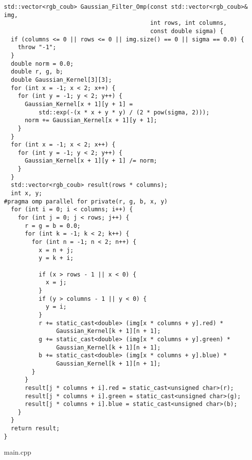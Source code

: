 \documentclass{report}
\begin{document}
\begin{lstlisting}
std::vector<rgb_coub> Gaussian_Filter_Omp(const std::vector<rgb_coub>& img,
                                          int rows, int columns,
                                          const double sigma) {
  if (columns <= 0 || rows <= 0 || img.size() == 0 || sigma == 0.0) {
    throw "-1";
  }
  double norm = 0.0;
  double r, g, b;
  double Gaussian_Kernel[3][3];
  for (int x = -1; x < 2; x++) {
    for (int y = -1; y < 2; y++) {
      Gaussian_Kernel[x + 1][y + 1] =
          std::exp(-(x * x + y * y) / (2 * pow(sigma, 2)));
      norm += Gaussian_Kernel[x + 1][y + 1];
    }
  }
  for (int x = -1; x < 2; x++) {
    for (int y = -1; y < 2; y++) {
      Gaussian_Kernel[x + 1][y + 1] /= norm;
    }
  }
  std::vector<rgb_coub> result(rows * columns);
  int x, y;
#pragma omp parallel for private(r, g, b, x, y)
  for (int i = 0; i < columns; i++) {
    for (int j = 0; j < rows; j++) {
      r = g = b = 0.0;
      for (int k = -1; k < 2; k++) {
        for (int n = -1; n < 2; n++) {
          x = n + j;
          y = k + i;

          if (x > rows - 1 || x < 0) {
            x = j;
          }
          if (y > columns - 1 || y < 0) {
            y = i;
          }
          r += static_cast<double> (img[x * columns + y].red) *
               Gaussian_Kernel[k + 1][n + 1];
          g += static_cast<double> (img[x * columns + y].green) *
               Gaussian_Kernel[k + 1][n + 1];
          b += static_cast<double> (img[x * columns + y].blue) *
               Gaussian_Kernel[k + 1][n + 1];
        }
      }
      result[j * columns + i].red = static_cast<unsigned char>(r);
      result[j * columns + i].green = static_cast<unsigned char>(g);
      result[j * columns + i].blue = static_cast<unsigned char>(b);
    }
  }
  return result;
}
\end{lstlisting}
main.cpp
\end{document}
